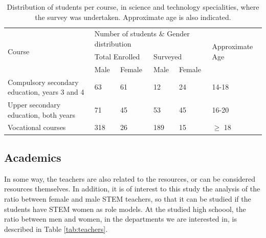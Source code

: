 \documentclass[journal,transmag]{IEEEtran}
\begin{document}
\begin{table}
  \caption[Students who undertook the surveys]{Distribution of students per course, in science and technology specialities, where the survey was undertaken. Approximate age is also indicated.}
  \label{tab:muestra}

  \begin{center}
    \begin{tabular}{|l|l|l|l|l|l|}
    \hline
    \multirow{3}{*}{Course}                       & \multicolumn{4}{l|}{Number of students \& Gender distribution}      & \multirow{3}{*}{Approximate Age} \\ \cline{2-5}
                                                  & \multicolumn{2}{l|}{Total Enrolled} & \multicolumn{2}{l|}{Surveyed} &                                  \\ \cline{2-5}
                                                  & Male             & Female           & Male         & Female         &                                  \\ \hline
    Compulsory secondary education, years 3 and 4 & 63               & 61               & 12           & 24             & 14-18                            \\ \hline
    Upper secondary education, both years         & 71               & 45               & 53           & 45             & 16-20                            \\ \hline
    Vocational courses                            & 318              & 26               & 189          & 15             & $\geq$ 18                        \\ \hline
    \end{tabular}
  \end{center}
\end{table}

\subsection{Academics}

In some way, the teachers are also related to the resources, or can be considered resources themselves. In addition, it is of interest to this study the analysis of the ratio between female and male STEM teachers, so that it can be studied if the students have STEM women as role models. At the studied high schoool, the ratio between men and women, in the departments we are interested in, is described in Table \ref{tab:teachers}.
\end{document}
